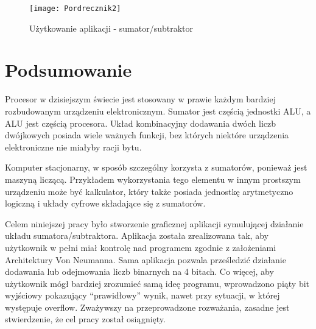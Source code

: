 \documentclass[12pt, a4paper, onside, polish]{article}				%
\begin{document}
   	\begin{figure}[H]
  	  {\centering \texttt{[image: Pordrecznik2]} \caption{Użytkowanie aplikacji - sumator/subtraktor}}\vspace{5mm}
  	 \end{figure}

\cleardoublepage




\section{Podsumowanie}
\hspace{\parindent}
Procesor w dzisiejszym świecie jest stosowany w prawie każdym bardziej rozbudowanym urządzeniu elektronicznym. Sumator jest częścią jednostki ALU, a ALU jest częścią procesora. Układ kombinacyjny dodawania dwóch liczb dwójkowych posiada wiele ważnych funkcji, bez których niektóre urządzenia elektroniczne nie miałyby racji bytu.

Komputer stacjonarny, w sposób szczególny korzysta z sumatorów, ponieważ jest maszyną liczącą. Przykładem wykorzystania tego elementu w innym prostszym urządzeniu może być kalkulator, który także posiada jednostkę arytmetyczno logiczną i układy cyfrowe składające się z sumatorów.

Celem niniejszej pracy było stworzenie graficznej aplikacji symulującej działanie układu sumatora/subtraktora. Aplikacja została zrealizowana tak, aby użytkownik w pełni miał kontrolę nad programem zgodnie z założeniami Architektury Von Neumanna. Sama aplikacja pozwala prześledzić działanie dodawania lub odejmowania liczb binarnych na 4 bitach. Co więcej, aby użytkownik mógł bardziej zrozumieć samą ideę programu, wprowadzono piąty bit wyjściowy pokazujący “prawidłowy” wynik, nawet przy sytuacji, w której występuje overflow. Zważywszy na przeprowadzone rozważania, zasadne jest stwierdzenie, że cel pracy został osiągnięty.

\cleardoublepage
\end{document}
